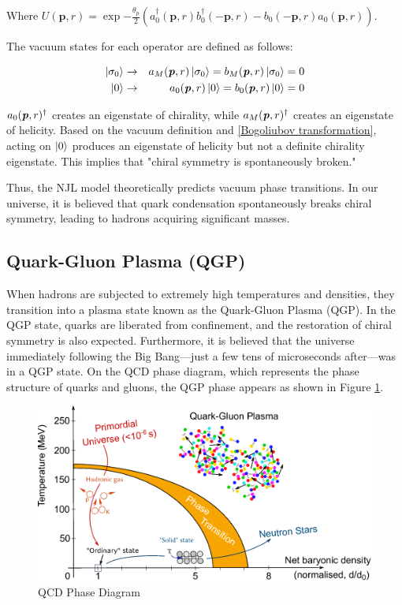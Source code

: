         Where $U(\bm{p},r) = \exp{-\frac{\theta_p}{2}(a_0^\dag(\bm{p},r)b_0^\dag(-\bm{p},r) - b_0(-\bm{p},r)a_0(\bm{p},r))}$.  
        
        The vacuum states for each operator are defined as follows:  

        \begin{eqnarray}
            \ket{\sigma_0} &\rightarrow&a_M(\textbf{\textit{p}},r)\ket{\sigma_0}=b_M(\textbf{\textit{p}},r)\ket{\sigma_0}=0\\
            \ket{0} &\rightarrow& a_0(\textbf{\textit{p}},r)\ket{0}=b_0(\textbf{\textit{p}},r)\ket{0}=0
        \end{eqnarray}
        
       $a_0(\textbf{\textit{p}},r)^{\dag}$ creates an eigenstate of chirality, while $a_M(\textbf{\textit{p}},r)^{\dag}$ creates an eigenstate of helicity. Based on the vacuum definition and \eqref{Bogoliubov transformation}, acting on $\ket{0}$ produces an eigenstate of helicity but not a definite chirality eigenstate. This implies that "chiral symmetry is spontaneously broken."  
        
        Thus, the NJL model theoretically predicts vacuum phase transitions. In our universe, it is believed that quark condensation spontaneously breaks chiral symmetry, leading to hadrons acquiring significant masses.
    \subsection{Quark-Gluon Plasma (QGP)}

        When hadrons are subjected to extremely high temperatures and densities, they transition into a plasma state known as the Quark-Gluon Plasma (QGP). In the QGP state, quarks are liberated from confinement, and the restoration of chiral symmetry is also expected. Furthermore, it is believed that the universe immediately following the Big Bang—just a few tens of microseconds after—was in a QGP state. On the QCD phase diagram, which represents the phase structure of quarks and gluons, the QGP phase appears as shown in Figure \ref{QCD_Phase_Diagram}.  
        
        \begin{figure}[hbtp]
            \centering
            \includegraphics[keepaspectratio, scale=0.6]{fig/1_4_QCDPhaseDiagram.png}
            \caption{QCD Phase Diagram\cite{QCDPhaseDiagram}}
            \label{QCD_Phase_Diagram}
        \end{figure}
        
